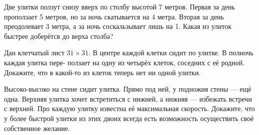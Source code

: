 ﻿
\begin{itemize}

\itA Две улитки ползут снизу вверх по столбу высотой 7 метров. Первая за день проползает 5 метров, но за ночь скатывается на 4 метра. Вторая за день преодолевает 3 метра, а за ночь соскальзывает лишь на 1. Какая из улиток быстрее доберётся до верха столба?

\itB Дан клетчатый лист $31 \times 31$. В центре каждой клетки сидит по улитке. В полночь каждая улитка пере- ползает на одну из четырёх клеток, соседних с её родной. Докажите, что в какой-то из клеток теперь нет ни одной улитки.

\itC Высоко-высоко на стене сидит улитка. Прямо под ней, у подножия стены — ещё одна. Верхняя улитка хочет встретиться с нижней, а нижняя — избежать встречи с верхней. Про каждую улитку известна её максимальная скорость. Докажите, что у более быстрой улитки из этих двоих всегда есть возможность осуществить своё собственное желание.
\end{itemize}